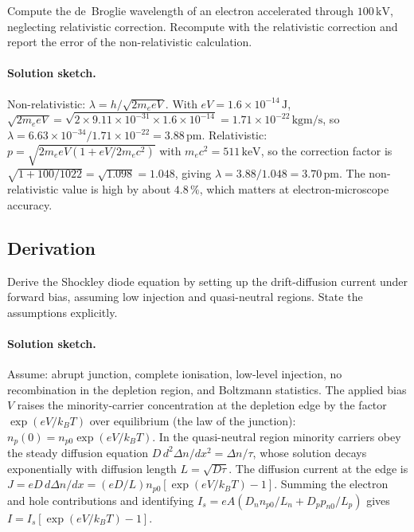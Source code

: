 \begin{exercise}
Compute the de~Broglie wavelength of an electron accelerated through
$100\,\si{\kilo\volt}$, neglecting relativistic correction.
Recompute with the relativistic correction and report the error of
the non-relativistic calculation.
\paragraph{Solution sketch.} Non-relativistic: $\lambda = h/\sqrt{2m_{e}
eV}$. With $eV = 1.6\times 10^{-14}\,\si{\joule}$, $\sqrt{2m_{e}eV} =
\sqrt{2\times 9.11\times 10^{-31}\times 1.6\times 10^{-14}} = 1.71\times
10^{-22}\,\si{\kilogram\meter\per\second}$, so $\lambda = 6.63\times
10^{-34}/1.71\times 10^{-22} = 3.88\,\si{\pico\meter}$. Relativistic:
$p = \sqrt{2m_{e}eV(1 + eV/2m_{e}c^{2})}$ with $m_{e}c^{2} = 511\,\si{
\kilo\electronvolt}$, so the correction factor is $\sqrt{1 + 100/1022} =
\sqrt{1.098} = 1.048$, giving $\lambda = 3.88/1.048 = 3.70\,\si{\pico
\meter}$. The non-relativistic value is high by about $4.8\,\%$, which
matters at electron-microscope accuracy.
\end{exercise}

\subsection*{Derivation}

\begin{exercise}
Derive the Shockley diode equation by setting up the drift-diffusion
current under forward bias, assuming low injection and quasi-neutral
regions. State the assumptions explicitly.
\paragraph{Solution sketch.} Assume: abrupt junction, complete
ionisation, low-level injection, no recombination in the depletion
region, and Boltzmann statistics. The applied bias $V$ raises the
minority-carrier concentration at the depletion edge by the factor
$\exp(eV/k_{B}T)$ over equilibrium (the law of the junction): $n_{p}(0)
= n_{p0}\exp(eV/k_{B}T)$. In the quasi-neutral region minority carriers
obey the steady diffusion equation $D\,d^{2}\Delta n/dx^{2} = \Delta n/
\tau$, whose solution decays exponentially with diffusion length
$L = \sqrt{D\tau}$. The diffusion current at the edge is $J = eD\,
d\Delta n/dx = (eD/L)n_{p0}[\exp(eV/k_{B}T) - 1]$. Summing the electron
and hole contributions and identifying $I_{s} = eA(D_{n}n_{p0}/L_{n} +
D_{p}p_{n0}/L_{p})$ gives $I = I_{s}[\exp(eV/k_{B}T) - 1]$.
\end{exercise}

